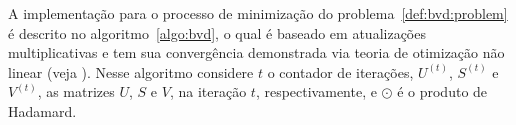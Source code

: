 \documentclass[
    12pt,                %
    oneside,            %
    a4paper,            %
    english,            %
    brazil                %
    ]{abntex2ppgsi}
\begin{document}
%
%
%
%

A implementação para o processo de minimização do problema~\ref{def:bvd:problem} é descrito no algoritmo~\ref{algo:bvd}, o qual é baseado em atualizações multiplicativas e tem sua convergência demonstrada via teoria de otimização não linear (veja ).
Nesse algoritmo considere $t$ o contador de iterações, $U^{(t)}$, $S^{(t)}$ e $V^{(t)}$, as matrizes $U$, $S$ e $V$, na iteração $t$, respectivamente, e $\odot$ é o produto de Hadamard.

\end{document}
